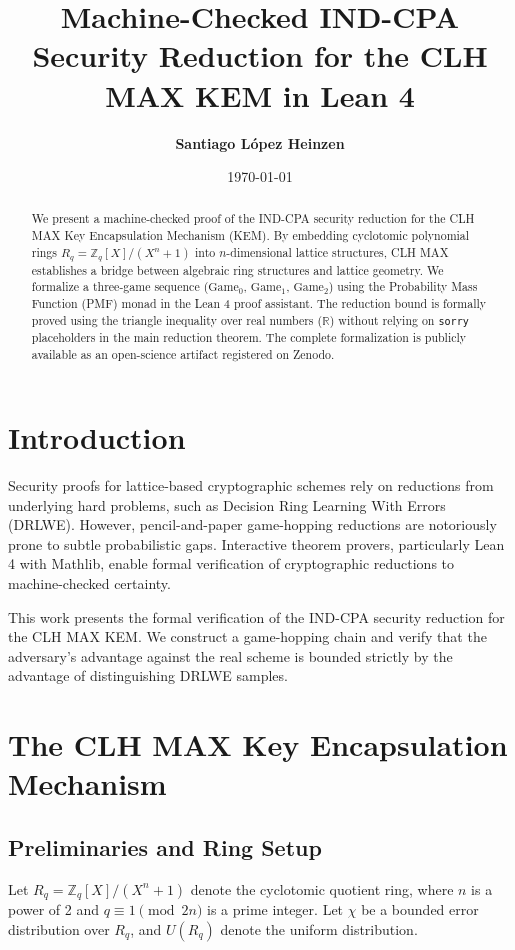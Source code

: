 \documentclass[11pt,a4paper]{article}
\title{\textbf{Machine-Checked IND-CPA Security Reduction for the CLH MAX KEM in Lean 4}}
\author{\textbf{Santiago López Heinzen}}
\date{\today}
\begin{document}
\maketitle

\begin{abstract}
We present a machine-checked proof of the IND-CPA security reduction for the \textsc{CLH MAX} Key Encapsulation Mechanism (KEM). By embedding cyclotomic polynomial rings $R_q = \mathbb{Z}_q[X]/(X^n + 1)$ into $n$-dimensional lattice structures, \textsc{CLH MAX} establishes a bridge between algebraic ring structures and lattice geometry. We formalize a three-game sequence ($\text{Game}_0$, $\text{Game}_1$, $\text{Game}_2$) using the Probability Mass Function (\textsf{PMF}) monad in the Lean 4 proof assistant. The reduction bound is formally proved using the triangle inequality over real numbers ($\mathbb{R}$) without relying on \texttt{sorry} placeholders in the main reduction theorem. The complete formalization is publicly available as an open-science artifact registered on Zenodo.
\end{abstract}

\section{Introduction}
Security proofs for lattice-based cryptographic schemes rely on reductions from underlying hard problems, such as Decision Ring Learning With Errors (DRLWE). However, pencil-and-paper game-hopping reductions are notoriously prone to subtle probabilistic gaps. Interactive theorem provers, particularly Lean 4 with \textsf{Mathlib}, enable formal verification of cryptographic reductions to machine-checked certainty.

This work presents the formal verification of the IND-CPA security reduction for the \textsc{CLH MAX} KEM. We construct a game-hopping chain and verify that the adversary's advantage against the real scheme is bounded strictly by the advantage of distinguishing DRLWE samples.

\section{The CLH MAX Key Encapsulation Mechanism}

\subsection{Preliminaries and Ring Setup}
Let $R_q = \mathbb{Z}_q[X]/(X^n + 1)$ denote the cyclotomic quotient ring, where $n$ is a power of 2 and $q \equiv 1 \pmod{2n}$ is a prime integer. Let $\chi$ be a bounded error distribution over $R_q$, and $U(R_q)$ denote the uniform distribution.
\end{document}
